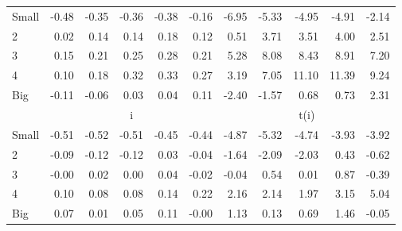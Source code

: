 \begin{table}[!ht]
\begin{tabular}{lrrrrrrrrrr}
    \\
      \cmidrule(r){2-6} \cmidrule(r){7-11}

    Small   & -0.48  & -0.35  & -0.36  & -0.38  & -0.16  & -6.95  & -5.33  & -4.95  & -4.91  & -2.14  \\
         2  & 0.02  & 0.14  & 0.14  & 0.18  & 0.12  & 0.51  & 3.71  & 3.51  & 4.00  & 2.51  \\
         3  & 0.15  & 0.21  & 0.25  & 0.28  & 0.21  & 5.28  & 8.08  & 8.43  & 8.91  & 7.20  \\
         4  & 0.10  & 0.18  & 0.32  & 0.33  & 0.27  & 3.19  & 7.05  & 11.10  & 11.39  & 9.24  \\
    Big     & -0.11  & -0.06  & 0.03  & 0.04  & 0.11  & -2.40  & -1.57  & 0.68  & 0.73  & 2.31  \\

  
    
      & \multicolumn{5}{c}{i} & \multicolumn{5}{c}{t(i)}
    
    \\
      \cmidrule(r){2-6} \cmidrule(r){7-11}

    Small   & -0.51  & -0.52  & -0.51  & -0.45  & -0.44  & -4.87  & -5.32  & -4.74  & -3.93  & -3.92  \\
         2  & -0.09  & -0.12  & -0.12  & 0.03  & -0.04  & -1.64  & -2.09  & -2.03  & 0.43  & -0.62  \\
         3  & -0.00  & 0.02  & 0.00  & 0.04  & -0.02  & -0.04  & 0.54  & 0.01  & 0.87  & -0.39  \\
         4  & 0.10  & 0.08  & 0.08  & 0.14  & 0.22  & 2.16  & 2.14  & 1.97  & 3.15  & 5.04  \\
    Big     & 0.07  & 0.01  & 0.05  & 0.11  & -0.00  & 1.13  & 0.13  & 0.69  & 1.46  & -0.05  \\

  

  \bottomrule
\end{tabular}
\label{tbl:25_Size_Prior_FF2015}
\end{table}